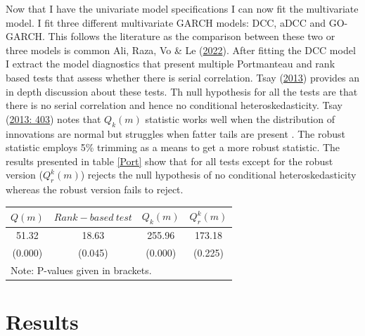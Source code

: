 \documentclass[11pt,preprint, authoryear]{elsarticle}
\let\origtable\table
\let\endorigtable\endtable
\renewenvironment{table}[1][2] {
    \expandafter\origtable\expandafter[H]
} {
    \endorigtable
}
\numberwithin{equation}{section}
\numberwithin{figure}{section}
\numberwithin{table}{section}
\begin{document}
Now that I have the univariate model specifications I can now fit the
multivariate model. I fit three different multivariate GARCH models:
DCC, aDCC and GO-GARCH. This follows the literature as the comparison
between these two or three models is common Ali, Raza, Vo \& Le
(\protect\hyperlink{ref-ali2022modelling}{2022}). After fitting the DCC
model I extract the model diagnostics that present multiple Portmanteau
and rank based tests that assess whether there is serial correlation.
Tsay (\protect\hyperlink{ref-tsay2013}{2013}) provides an in depth
discussion about these tests. Th null hypothesis for all the tests are
that there is no serial correlation and hence no conditional
heteroskedasticity. Tsay (\protect\hyperlink{ref-tsay2013}{2013: 403})
notes that \(Q_k (m)\) statistic works well when the distribution of
innovations are normal but struggles when fatter tails are present . The
robust statistic employs 5\% trimming as a means to get a more robust
statistic. The results presented in table \ref{Port} show that for all
tests except for the robust version (\(Q_r^{k} (m)\)) rejects the null
hypothesis of no conditional heteroskedasticity whereas the robust
version fails to reject.

\begin{table}[htbp]
\centering
\caption{Portmanteau tests}
\label{Port}
\begin{tabular}{|c|c|c|c|}
\hline
$Q(m)$ & $Rank-based \ test$ & $Q_k(m)$ & $Q_r^{k} (m)$ \\
\hline
\hline
51.32 & 18.63 & 255.96 & 173.18 \\
(0.000) & (0.045) & (0.000) & (0.225) \\
\hline
\multicolumn{4}{|l|}{Note: P-values given in brackets.} \\
\hline
\end{tabular}
\end{table}

\hypertarget{results}{%
\section{Results}\label{results}}
\end{document}
